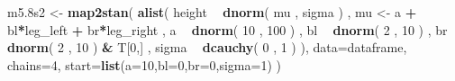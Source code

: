 \documentclass[]{article}
\newenvironment{Shaded}{\begin{snugshade}}{\end{snugshade}}
\newcommand{\KeywordTok}[1]{\textcolor[rgb]{0.13,0.29,0.53}{\textbf{#1}}}
\newcommand{\DataTypeTok}[1]{\textcolor[rgb]{0.13,0.29,0.53}{#1}}
\newcommand{\DecValTok}[1]{\textcolor[rgb]{0.00,0.00,0.81}{#1}}
\newcommand{\StringTok}[1]{\textcolor[rgb]{0.31,0.60,0.02}{#1}}
\newcommand{\OperatorTok}[1]{\textcolor[rgb]{0.81,0.36,0.00}{\textbf{#1}}}
\newcommand{\NormalTok}[1]{#1}
\begin{document}
\begin{Shaded}
\begin{Highlighting}[]
\NormalTok{m5.8s2 <-}\StringTok{ }\KeywordTok{map2stan}\NormalTok{(}
    \KeywordTok{alist}\NormalTok{(}
\NormalTok{        height }\OperatorTok{~}\StringTok{ }\KeywordTok{dnorm}\NormalTok{( mu , sigma ) ,}
\NormalTok{        mu <-}\StringTok{ }\NormalTok{a }\OperatorTok{+}\StringTok{ }\NormalTok{bl}\OperatorTok{*}\NormalTok{leg_left }\OperatorTok{+}\StringTok{ }\NormalTok{br}\OperatorTok{*}\NormalTok{leg_right ,}
\NormalTok{        a }\OperatorTok{~}\StringTok{ }\KeywordTok{dnorm}\NormalTok{( }\DecValTok{10}\NormalTok{ , }\DecValTok{100}\NormalTok{ ) ,}
\NormalTok{        bl }\OperatorTok{~}\StringTok{ }\KeywordTok{dnorm}\NormalTok{( }\DecValTok{2}\NormalTok{ , }\DecValTok{10}\NormalTok{ ) ,}
\NormalTok{        br }\OperatorTok{~}\StringTok{ }\KeywordTok{dnorm}\NormalTok{( }\DecValTok{2}\NormalTok{ , }\DecValTok{10}\NormalTok{ ) }\OperatorTok{&}\StringTok{ }\NormalTok{T[}\DecValTok{0}\NormalTok{,] ,}
\NormalTok{        sigma }\OperatorTok{~}\StringTok{ }\KeywordTok{dcauchy}\NormalTok{( }\DecValTok{0}\NormalTok{ , }\DecValTok{1}\NormalTok{ )}
\NormalTok{),}
\DataTypeTok{data=}\NormalTok{dataframe, }\DataTypeTok{chains=}\DecValTok{4}\NormalTok{, }\DataTypeTok{start=}\KeywordTok{list}\NormalTok{(}\DataTypeTok{a=}\DecValTok{10}\NormalTok{,}\DataTypeTok{bl=}\DecValTok{0}\NormalTok{,}\DataTypeTok{br=}\DecValTok{0}\NormalTok{,}\DataTypeTok{sigma=}\DecValTok{1}\NormalTok{) )}
\end{Highlighting}
\end{Shaded}
\end{document}
